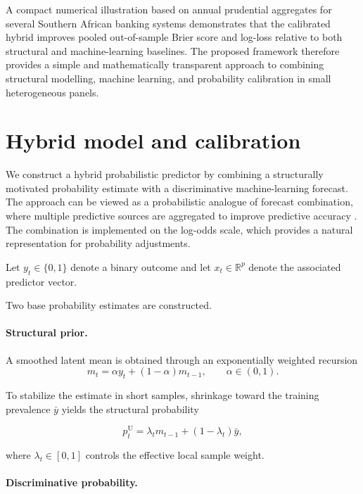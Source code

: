 \documentclass[a4paper,fleqn]{cas-dc}
\begin{document}
	A compact numerical illustration based on annual prudential aggregates for several Southern African banking systems demonstrates that the calibrated hybrid improves pooled out-of-sample Brier score and log-loss relative to both structural and machine-learning baselines. The proposed framework therefore provides a simple and mathematically transparent approach to combining structural modelling, machine learning, and probability calibration in small heterogeneous panels.
	
	
	\section{Hybrid model and calibration}
	
	We construct a hybrid probabilistic predictor by combining a structurally motivated probability estimate with a discriminative machine-learning forecast. The approach can be viewed as a probabilistic analogue of forecast combination, where multiple predictive sources are aggregated to improve predictive accuracy \citep{BatesGranger1969,Clemen1989}. The combination is implemented on the log-odds scale, which provides a natural representation for probability adjustments.
	
	Let $y_t\in\{0,1\}$ denote a binary outcome and let $x_t\in\mathbb{R}^p$ denote the associated predictor vector.
	
	Two base probability estimates are constructed.
	
	\paragraph{Structural prior.}
	
	A smoothed latent mean is obtained through an exponentially weighted recursion
	\begin{equation}
		m_t=\alpha y_t+(1-\alpha)m_{t-1},\qquad \alpha\in(0,1).
	\end{equation}
	
	To stabilize the estimate in short samples, shrinkage toward the training prevalence $\bar y$ yields the structural probability
	
	\begin{equation}
		p_t^{\mathrm{U}}=\lambda_t m_{t-1}+(1-\lambda_t)\bar y,
	\end{equation}
	
	where $\lambda_t\in[0,1]$ controls the effective local sample weight.
	
	\paragraph{Discriminative probability.}
	
\end{document}
